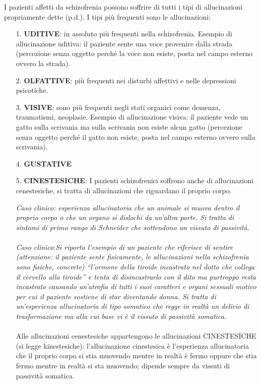 \begin{itemize}
\begin{itemize}
I pazienti affetti da schizofrenia possono soffrire di tutti i tipi di
allucinazioni propriamente dette (p.d.). I tipi più frequenti sono le
allucinazioni:


\begin{itemize}
\item[1.]
  \textbf{UDITIVE}: in assoluto più frequenti nella schizofrenia.
  Esempio di allucinazione uditiva: il paziente sente una voce provenire
  dalla strada (percezione senza oggetto perché la voce non esiste,
  posta nel campo esterno ovvero la strada).
\item[2.]
  \textbf{OLFATTIVE}: più frequenti nei disturbi affettivi e nelle
  depressioni psicotiche.
\item[3.]
  \textbf{VISIVE}: sono più frequenti negli stati organici come demenza,
  traumatismi, neoplasie. Esempio di allucinazione visiva: il paziente
  vede un gatto sulla scrivania ma sulla scrivania non esiste alcun
  gatto (percezione senza oggetto perché il gatto non esiste, posta nel
  campo esterno ovvero sulla scrivania).
\item[4.]
  \textbf{GUSTATIVE}
\item[5.]
  \textbf{CINESTESICHE}: I pazienti schizofrenici soffrono anche di
  allucinazioni cenestesiche, si tratta di allucinazioni che riguardano
  il proprio corpo.

\emph{Caso clinico: esperienza allucinatoria che un animale si muova
dentro il proprio corpo o che un organo si dislochi da un'altra parte.
Si tratta di sintomi di primo rango di Schneider che sottendono un
vissuto di passività.}
\\\\
\emph{Caso clinico}:\emph{Si riporta l'esempio di un paziente che
riferisce di sentire (attenzione: il paziente sente fisicamente, le
allucinazioni nella schizofrenia sono fisiche, concrete) ``l'ormone
della tiroide incastrato nel dotto che collega il cervello alla
tiroide'' e tenta di disincastrarlo con il dito ma purtroppo resta
incastrato causando un'atrofia di tutti i suoi caratteri e organi
sessuali motivo per cui il paziente sostiene di star diventando donna.
Si tratta di un'esperienza allucinatoria di tipo somatico che regge in
realtà un delirio di trasformazione ma alla cui base vi è il vissuto di
passività somatica. }
\\\\
Alle allucinazioni cenestesiche appartengono le allucinazioni
CINESTESICHE (si legge kinestesiche): l'allucinazione cinestesica è
l'esperienza allucinatoria che il proprio corpo si stia muovendo mentre
in realtà è fermo oppure che stia fermo mentre in realtà si sta
muovendo; dipende sempre da vissuti di passività somatica.


\end{itemize}
\end{itemize}
\end{itemize}
